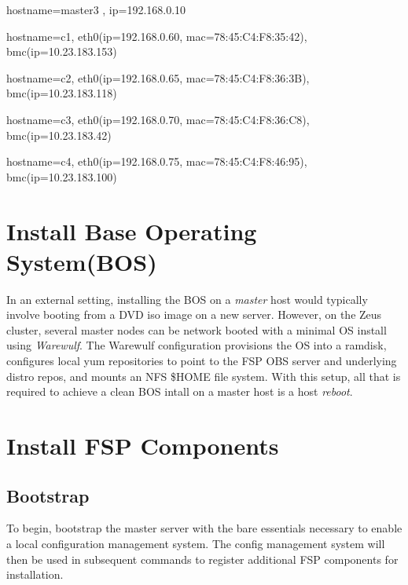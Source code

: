 \documentclass[letterpaper]{article}
\begin{document}

\begin{itemize*}
\item hostname=master3 , ip=192.168.0.10
\item hostname=c1, eth0(ip=192.168.0.60, mac=78:45:C4:F8:35:42), bmc(ip=10.23.183.153)
\item hostname=c2, eth0(ip=192.168.0.65, mac=78:45:C4:F8:36:3B), bmc(ip=10.23.183.118)
\item hostname=c3, eth0(ip=192.168.0.70, mac=78:45:C4:F8:36:C8), bmc(ip=10.23.183.42)
\item hostname=c4, eth0(ip=192.168.0.75, mac=78:45:C4:F8:46:95), bmc(ip=10.23.183.100)
\end{itemize*}

\section{Install Base Operating System(BOS)}

In an external setting, installing the BOS on a {\em master} host would
typically involve booting from a DVD iso image on a new server.  However, on
the Zeus cluster, several master nodes can be network booted with a minimal OS
install using {\em Warewulf}. The Warewulf configuration provisions the OS into
a ramdisk, configures local yum repositories to point to the FSP OBS server and
underlying distro repos, and mounts an NFS \$HOME file system. With this setup,
all that is required to achieve a clean BOS intall on a master host is a host
{\em reboot}. 

\section{Install FSP Components}

\subsection{Bootstrap}

To begin, bootstrap the master server with the bare essentials necessary to
enable a local configuration management system. The config management system
will then be used in subsequent commands to register additional FSP components
for installation.
\end{document}
